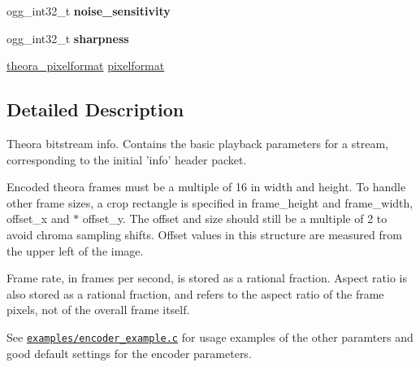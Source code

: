 \begin{DoxyCompactItemize}
\item 
\hypertarget{structtheora__info_ac4789034f547b57d1075e035050eeed9}{ogg\+\_\+int32\+\_\+t {\bfseries noise\+\_\+sensitivity}}\label{structtheora__info_ac4789034f547b57d1075e035050eeed9}

\item 
\hypertarget{structtheora__info_a3fb695de2b2f56dd0203b9e2eb0df1cc}{ogg\+\_\+int32\+\_\+t {\bfseries sharpness}}\label{structtheora__info_a3fb695de2b2f56dd0203b9e2eb0df1cc}

\item 
\hyperlink{group__oldfuncs_gae169da05bfaaf4e964a6866552d45079}{theora\+\_\+pixelformat} \hyperlink{structtheora__info_a65ab4376ab5242ee82e06c78fb7008ab}{pixelformat}
\end{DoxyCompactItemize}


\subsection{Detailed Description}
Theora bitstream info. Contains the basic playback parameters for a stream, corresponding to the initial 'info' header packet.

Encoded theora frames must be a multiple of 16 in width and height. To handle other frame sizes, a crop rectangle is specified in frame\+\_\+height and frame\+\_\+width, offset\+\_\+x and $\ast$ offset\+\_\+y. The offset and size should still be a multiple of 2 to avoid chroma sampling shifts. Offset values in this structure are measured from the upper left of the image.

Frame rate, in frames per second, is stored as a rational fraction. Aspect ratio is also stored as a rational fraction, and refers to the aspect ratio of the frame pixels, not of the overall frame itself.

See \href{http://svn.xiph.org/trunk/theora/examples/encoder_example.c}{\tt examples/encoder\+\_\+example.\+c} for usage examples of the other paramters and good default settings for the encoder parameters. 

